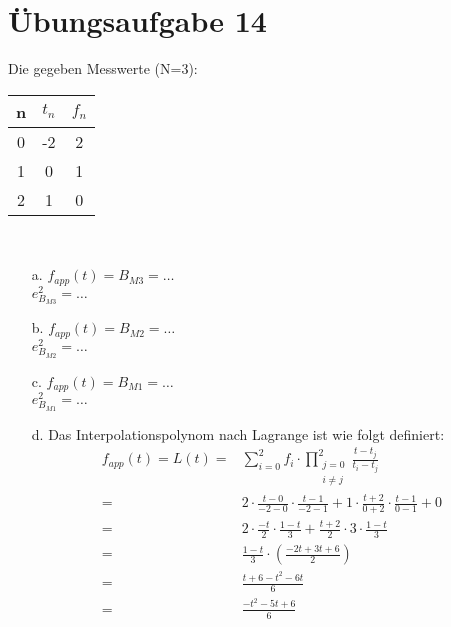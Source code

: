 

    \section*{Übungsaufgabe 14}
    Die gegeben Messwerte (N=3):\\
    \begin{tabular}{|c| c| c|}
    	\hline
		\textbf{n}	&	\textbf{$t_n$}	&	\textbf{$f_n$}\\
		\hline
		0	&	-2	&	2\\
		1	&	0	&	1\\
		2	&	1	&	0
    \end{tabular}\\
	\begin{itemize}
		\item[a.]
		$f_{app}(t) = B_{M3} = \dots$\\
		$e_{B_{M3}}^2 = \dots$
		\item[b.]
		$f_{app}(t) = B_{M2} = \dots$\\
		$e_{B_{M2}}^2 = \dots$
		\item[c.]	
		$f_{app}(t) = B_{M1} = \dots$\\
		$e_{B_{M1}}^2 = \dots$
		\item[d.] Das Interpolationspolynom nach Lagrange ist wie folgt definiert:
		\begin{align*}
			f_{app}(t) = L(t)	=& \sum_{i=0}^2 f_i\cdot \prod_{\substack{j=0\\i\ne j}}^2\frac{t - t_j}{t_i-t_j}\\
								=& 2\cdot\frac{t-0}{-2-0}\cdot\frac{t-1}{-2-1} + 1\cdot \frac{t+2}{0+2}\cdot\frac{t-1}{0-1} + 0\\
								=& 2\cdot\frac{-t}{2}\cdot\frac{1-t}{3} + \frac{t+2}{2}\cdot3\cdot\frac{1-t}{3}\\
								=& \frac{1-t}{3}\cdot\left(\frac{-2t+3t+6}{2}\right)\\
								=& \frac{t+6-t^2-6t}{6}\\
								=& \frac{-t^2-5t+6}{6}
		\end{align*}
	\end{itemize}
	\begin{figure}
	\end{figure}
